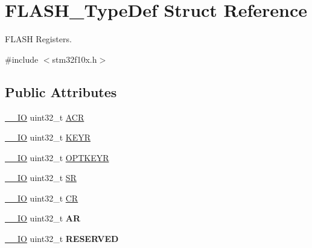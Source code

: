 \hypertarget{struct_f_l_a_s_h___type_def}{\section{F\-L\-A\-S\-H\-\_\-\-Type\-Def Struct Reference}
\label{struct_f_l_a_s_h___type_def}
}


F\-L\-A\-S\-H Registers.  




{\ttfamily \#include $<$stm32f10x.\-h$>$}

\subsection*{Public Attributes}
\begin{DoxyCompactItemize}
\item 
\hyperlink{group___c_m_s_i_s__core__definitions_gaec43007d9998a0a0e01faede4133d6be}{\-\_\-\-\_\-\-I\-O} uint32\-\_\-t \hyperlink{struct_f_l_a_s_h___type_def_aaf432a8a8948613f4f66fcace5d2e5fe}{A\-C\-R}
\item 
\hyperlink{group___c_m_s_i_s__core__definitions_gaec43007d9998a0a0e01faede4133d6be}{\-\_\-\-\_\-\-I\-O} uint32\-\_\-t \hyperlink{struct_f_l_a_s_h___type_def_a802e9a26a89b44decd2d32d97f729dd3}{K\-E\-Y\-R}
\item 
\hyperlink{group___c_m_s_i_s__core__definitions_gaec43007d9998a0a0e01faede4133d6be}{\-\_\-\-\_\-\-I\-O} uint32\-\_\-t \hyperlink{struct_f_l_a_s_h___type_def_a793cd13a4636c9785fdb99316f7fd7ab}{O\-P\-T\-K\-E\-Y\-R}
\item 
\hyperlink{group___c_m_s_i_s__core__definitions_gaec43007d9998a0a0e01faede4133d6be}{\-\_\-\-\_\-\-I\-O} uint32\-\_\-t \hyperlink{struct_f_l_a_s_h___type_def_a52c4943c64904227a559bf6f14ce4de6}{S\-R}
\item 
\hyperlink{group___c_m_s_i_s__core__definitions_gaec43007d9998a0a0e01faede4133d6be}{\-\_\-\-\_\-\-I\-O} uint32\-\_\-t \hyperlink{struct_f_l_a_s_h___type_def_a7919306d0e032a855200420a57f884d7}{C\-R}
\item 
\hypertarget{struct_f_l_a_s_h___type_def_a9cd77bc29038841798b4b63c5cecdb9d}{\hyperlink{group___c_m_s_i_s__core__definitions_gaec43007d9998a0a0e01faede4133d6be}{\-\_\-\-\_\-\-I\-O} uint32\-\_\-t {\bfseries A\-R}}\label{struct_f_l_a_s_h___type_def_a9cd77bc29038841798b4b63c5cecdb9d}

\item 
\hypertarget{struct_f_l_a_s_h___type_def_a32e5cc660e711dc5424f827e2d4efd88}{\hyperlink{group___c_m_s_i_s__core__definitions_gaec43007d9998a0a0e01faede4133d6be}{\-\_\-\-\_\-\-I\-O} uint32\-\_\-t {\bfseries R\-E\-S\-E\-R\-V\-E\-D}}\label{struct_f_l_a_s_h___type_def_a32e5cc660e711dc5424f827e2d4efd88}


\end{DoxyCompactItemize}
